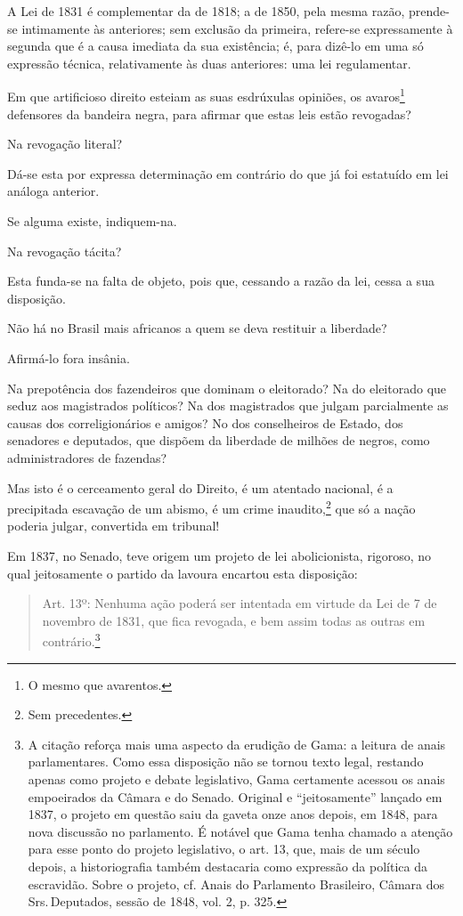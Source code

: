 {A Lei de 1831 é complementar da de 1818; a de 1850, pela mesma razão,
prende-se intimamente às anteriores; sem exclusão da primeira, refere-se
expressamente à segunda que é a causa imediata da sua existência; é,
para dizê-lo em uma só expressão técnica, relativamente às duas
anteriores: uma lei regulamentar.

\asterisc

Em que artificioso direito esteiam as suas esdrúxulas opiniões, os
avaros\footnote{O mesmo que avarentos.} defensores da bandeira negra,
para afirmar que estas leis estão revogadas?

Na revogação literal?

Dá-se esta por expressa determinação em contrário do que já foi
estatuído em lei análoga anterior.

Se alguma existe, indiquem-na.

Na revogação tácita?

Esta funda-se na falta de objeto, pois que, cessando a razão da lei,
cessa a sua disposição.

Não há no Brasil mais africanos a quem se deva restituir a liberdade?

Afirmá-lo fora insânia.

Na prepotência dos fazendeiros que dominam o eleitorado? Na do
eleitorado que seduz aos magistrados políticos? Na dos magistrados que
julgam parcialmente as causas dos correligionários e amigos? No dos
conselheiros de Estado, dos senadores e deputados, que dispõem da
liberdade de milhões de negros, como administradores de fazendas?

Mas isto é o cerceamento geral do Direito, é um atentado nacional, é a
precipitada escavação de um abismo, é um crime inaudito,\footnote{Sem
  precedentes.} que só a nação poderia julgar, convertida em tribunal!

Em 1837, no Senado, teve origem um projeto de lei abolicionista,
rigoroso, no qual jeitosamente o partido da lavoura encartou esta
disposição:

\begin{quote}
Art. 13º: Nenhuma ação poderá ser intentada em virtude da Lei de 7 de
novembro de 1831, que fica revogada, e bem assim todas as outras em
contrário.\footnote{A citação reforça mais uma aspecto da erudição de
  Gama: a leitura de anais parlamentares. Como essa disposição não se
  tornou texto legal, restando apenas como projeto e debate legislativo,
  Gama certamente acessou os anais empoeirados da Câmara e do Senado.
  Original e ``jeitosamente'' lançado em 1837, o projeto em questão saiu
  da gaveta onze anos depois, em 1848, para nova discussão no
  parlamento. É notável que Gama tenha chamado a atenção para esse ponto
  do projeto legislativo, o art. 13, que, mais de um século depois, a
  historiografia também destacaria como expressão da política da
  escravidão. Sobre o projeto, cf. Anais do Parlamento Brasileiro,
  Câmara dos Srs.\,Deputados, sessão de 1848, vol. 2, p. 325.}
\end{quote}

}
